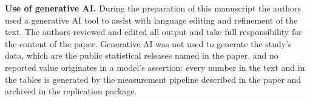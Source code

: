 \documentclass[11pt]{article}
\begin{document}
\vspace{0.5em}

\noindent\textbf{Use of generative AI.} During the preparation of this manuscript the authors
used a generative AI tool to assist with language editing and refinement of the text. The authors
reviewed and edited all output and take full responsibility for the content of the paper.
Generative AI was not used to generate the study's data, which are the public statistical
releases named in the paper, and no reported value originates in a model's assertion: every
number in the text and in the tables is generated by the measurement pipeline described in the
paper and archived in the replication package.
\end{document}
